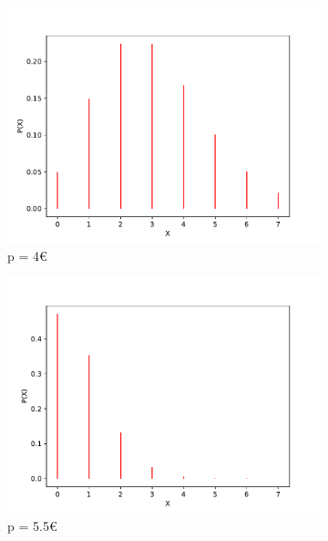 \documentclass[12pt,a4paper]{report}
\begin{document}
\begin{figure}[H]
\renewcommand*\thesubfigure{\roman{subfigure}} 
\centering
\begin{subfigure}{.49\textwidth}
  \centering
  \includegraphics[width=1\linewidth]{4e}
  \caption{p = 4\euro}
  \label{fig:sub1}
\end{subfigure}
\begin{subfigure}{.49\textwidth}
  \centering
  \includegraphics[width=1\linewidth]{55e}
  \caption{p = 5.5\euro}
  \label{fig:sub2}
\end{subfigure}
\begin{subfigure}{.49\textwidth}
  \centering

\end{subfigure}
\end{figure}
\end{document}

